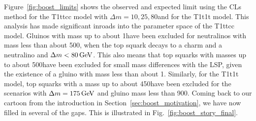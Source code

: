 Figure~\ref{fig:boost_limits} shows the observed and expected limit using the CLs method for the
T1ttcc model with $\Delta m=10,25,80$\GeV and for the T1t1t model. This analysis has
made significant inroads into the parameter space of the T1ttcc model. 
Gluinos with mass up to about 1\TeV have been excluded for neutralinos with mass less than about
500\GeV, when the top squark decays to a charm and a neutralino and $\Delta m < 80\,\text{Ge\hspace{-.08em}V}$. This also
means that top squarks with masses up to about 500\GeV have been excluded for small mass
differences with the LSP, given the existence of a gluino with mass less than about 1\TeV. 
Similarly, for the T1t1t model, top squarks with a mass up to about 450\GeV have been excluded
for the scenarios with $\Delta m = 175\,\text{Ge\hspace{-.08em}V}$ and gluino mass less than 900\GeV.
Coming back to our cartoon from the introduction in Section~\ref{sec:boost_motivation}, we have now
filled in several of the gaps. This is illustrated in Fig.~\ref{fig:boost_story_final}. 



